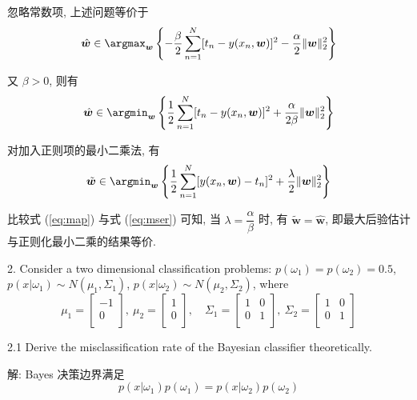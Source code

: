 \documentclass[openany]{ctexbook}
\theoremstyle{kaiti}
\theoremstyle{normal}
\begin{document}
忽略常数项, 上述问题等价于
\begin{equation}
  \hat{\bm{w}}\in\argmax_{\bm{w}}\left\{-\frac{\beta}{2}\sum_{n=1}^N[t_n-y(x_n,\bm{w})]^2-\frac{\alpha}{2}\|\bm{w}\|_2^2\right\}
\end{equation}

又 $\beta>0$, 则有
\begin{equation}
  \label{eq:map}
  \hat{\bm{w}}\in\argmin_{\bm{w}}\left\{\frac{1}{2}\sum_{n=1}^N[t_n-y(x_n,\bm{w})]^2+\frac{\alpha}{2\beta}\|\bm{w}\|_2^2\right\}
\end{equation}

对加入正则项的最小二乘法, 有
\begin{equation}
  \label{eq:mser}
  \tilde{\bm{w}}\in\argmin_{\bm{w}}\left\{\frac{1}{2}\sum_{n=1}^N[y(x_n,\bm{w})-t_n]^2+\frac{\lambda}{2} \|\bm{w}\|_2^2\right\}
\end{equation}

比较式 (\ref{eq:map}) 与式 (\ref{eq:mser}) 可知, 当 $\lambda=\dfrac{\alpha}{\beta}$ 时, 有 $\tilde{\bm{w}}=\hat{\bm{w}}$, 即最大后验估计与正则化最小二乘的结果等价.

2. Consider a two dimensional classification problems: $p(\omega_{1})=p(\omega_{2})= 0.5$, $p(x|\omega_{1}) \sim N(\mu_{1},\Sigma_{1})$, $p(x|\omega_{2}) \sim N(\mu_{2},\Sigma_{2})$, where
\begin{equation}
  \mu_1=
    \begin{bmatrix}
      -1 \\ 
      0 \\
    \end{bmatrix},~
  \mu_2=
    \begin{bmatrix}
      1 \\ 
      0 \\
    \end{bmatrix},\quad
  \Sigma_1=
    \begin{bmatrix}
      1 & 0 \\
      0 & 1 \\
    \end{bmatrix},~
  \Sigma_2=
    \begin{bmatrix}
      1 & 0 \\
      0 & 1 \\
    \end{bmatrix}
\end{equation}

2.1 Derive the misclassification rate of the Bayesian classifier theoretically.

解: Bayes 决策边界满足
\begin{equation}
  p(x|\omega_{1})p(\omega_{1})=p(x|\omega_{2})p(\omega_{2})
\end{equation}
\end{document}
